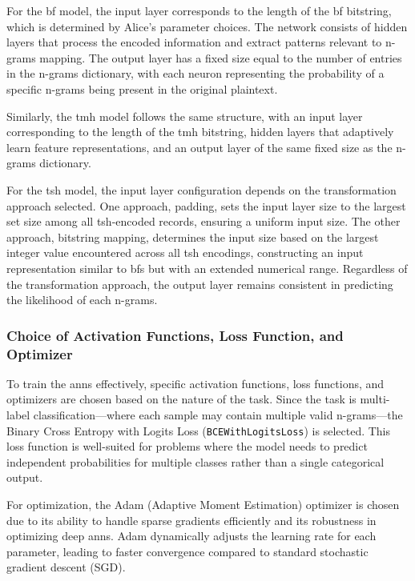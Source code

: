 For the \ac{bf} model, the input layer corresponds to the length of the \ac{bf} bitstring, which is determined by Alice’s parameter choices.
The network consists of hidden layers that process the encoded information and extract patterns relevant to n-grams mapping.
The output layer has a fixed size equal to the number of entries in the n-grams dictionary, with each neuron representing the probability of a specific n-grams being present in the original plaintext.

Similarly, the \ac{tmh} model follows the same structure, with an input layer corresponding to the length of the \ac{tmh} bitstring, hidden layers that adaptively learn feature representations, and an output layer of the same fixed size as the n-grams dictionary.

For the \ac{tsh} model, the input layer configuration depends on the transformation approach selected.
One approach, padding, sets the input layer size to the largest set size among all \ac{tsh}-encoded records, ensuring a uniform input size.
The other approach, bitstring mapping, determines the input size based on the largest integer value encountered across all \ac{tsh} encodings, constructing an input representation similar to \ac{bf}s but with an extended numerical range.
Regardless of the transformation approach, the output layer remains consistent in predicting the likelihood of each n-grams.

\subsubsection{Choice of Activation Functions, Loss Function, and Optimizer}

To train the \ac{ann}s effectively, specific activation functions, loss functions, and optimizers are chosen based on the nature of the task.
Since the task is multi-label classification—where each sample may contain multiple valid n-grams—the Binary Cross Entropy with Logits Loss (\texttt{BCEWithLogitsLoss}) is selected.
This loss function is well-suited for problems where the model needs to predict independent probabilities for multiple classes rather than a single categorical output.

For optimization, the Adam (Adaptive Moment Estimation) optimizer is chosen due to its ability to handle sparse gradients efficiently and its robustness in optimizing deep \ac{ann}s.
Adam dynamically adjusts the learning rate for each parameter, leading to faster convergence compared to standard stochastic gradient descent (SGD).

